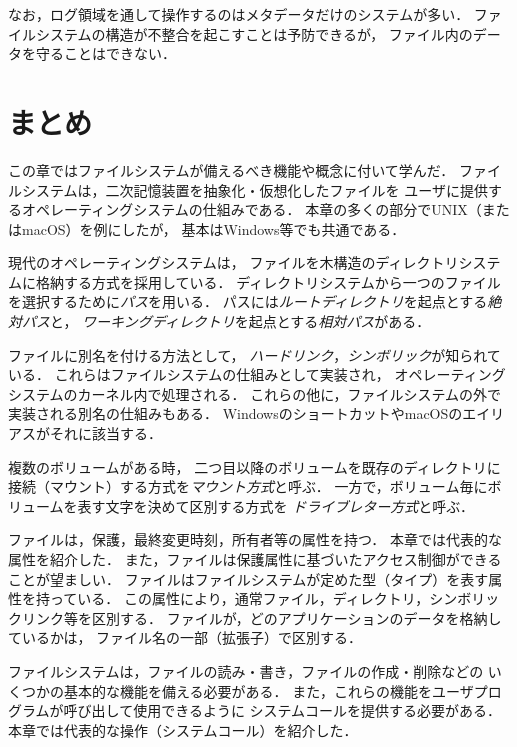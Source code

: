 なお，ログ領域を通して操作するのはメタデータだけのシステムが多い．
ファイルシステムの構造が不整合を起こすことは予防できるが，
ファイル内のデータを守ることはできない．

\section{まとめ}
この章ではファイルシステムが備えるべき機能や概念に付いて学んだ．
ファイルシステムは，二次記憶装置を抽象化・仮想化したファイルを
ユーザに提供するオペレーティングシステムの仕組みである．
本章の多くの部分でUNIX（またはmacOS）を例にしたが，
基本はWindows等でも共通である．

現代のオペレーティングシステムは，
ファイルを木構造のディレクトリシステムに格納する方式を採用している．
ディレクトリシステムから一つのファイルを選択するために\emph{パス}を用いる．
パスには\emph{ルートディレクトリ}を起点とする\emph{絶対パス}と，
\emph{ワーキングディレクトリ}を起点とする\emph{相対パス}がある．

ファイルに別名を付ける方法として，
\emph{ハードリンク}，\emph{シンボリック}が知られている．
これらはファイルシステムの仕組みとして実装され，
オペレーティングシステムのカーネル内で処理される．
これらの他に，ファイルシステムの外で実装される別名の仕組みもある．
WindowsのショートカットやmacOSのエイリアスがそれに該当する．

複数のボリュームがある時，
二つ目以降のボリュームを既存のディレクトリに
接続（マウント）する方式を\emph{マウント方式}と呼ぶ．
一方で，ボリューム毎にボリュームを表す文字を決めて区別する方式を
\emph{ドライブレター方式}と呼ぶ．

ファイルは，保護，最終変更時刻，所有者等の属性を持つ．
本章では代表的な属性を紹介した．
また，ファイルは保護属性に基づいたアクセス制御ができることが望ましい．
ファイルはファイルシステムが定めた型（タイプ）を表す属性を持っている．
この属性により，通常ファイル，ディレクトリ，シンボリックリンク等を区別する．
ファイルが，どのアプリケーションのデータを格納しているかは，
ファイル名の一部（拡張子）で区別する．

ファイルシステムは，ファイルの読み・書き，ファイルの作成・削除などの
いくつかの基本的な機能を備える必要がある．
また，これらの機能をユーザプログラムが呼び出して使用できるように
システムコールを提供する必要がある．
本章では代表的な操作（システムコール）を紹介した．

